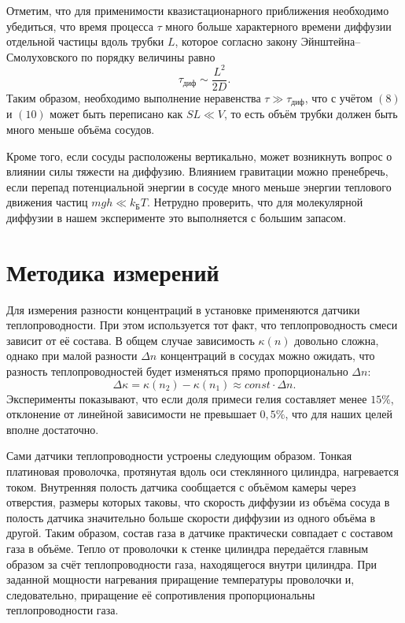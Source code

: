 \documentclass[a4paper,12pt]{article}
\begin{document}
Отметим, что для применимости квазистационарного приближения необходимо убедиться, что время процесса $\tau$ много больше характерного времени диффузии отдельной частицы вдоль трубки $L$, которое согласно закону Эйнштейна–Смолуховского по порядку величины равно
\begin{equation}
	\tau_{\text{диф}} \sim \dfrac{L^2}{2D}.
\end{equation}
Таким образом, необходимо выполнение неравенства $\tau \gg \tau_{\text{диф}}$, что с учётом $(8)$ и $(10)$ может быть переписано как $SL \ll V$, то есть объём трубки должен быть много меньше объёма сосудов.

Кроме того, если сосуды расположены вертикально, может возникнуть вопрос о влиянии силы тяжести на диффузию. Влиянием гравитации можно пренебречь, если перепад потенциальной энергии в сосуде много меньше энергии теплового движения частиц $mgh \ll k_{\text{Б}} T$. Нетрудно проверить, что для молекулярной диффузии в нашем эксперименте это выполняется с большим запасом.

\section{Методика измерений}

 Для измерения разности концентраций в установке применяются датчики теплопроводности. При этом используется тот факт, что теплопроводность смеси зависит от её состава. В общем случае зависимость $\kappa(n)$ довольно сложна, однако при малой разности $\Delta n$ концентраций в сосудах можно ожидать, что разность теплопроводностей будет изменяться прямо пропорционально $\Delta n$: $$\Delta \kappa = \kappa (n_2) - \kappa (n_1) \approx const \cdot \Delta n.$$
Эксперименты показывают, что если доля примеси гелия составляет менее $15\%$, отклонение от линейной зависимости не превышает $0,5\%$, что для наших целей вполне достаточно.

Сами датчики теплопроводности устроены следующим образом. Тонкая платиновая проволочка, протянутая вдоль оси стеклянного цилиндра, нагревается током. Внутренняя полость датчика сообщается с объёмом камеры через отверстия, размеры которых таковы, что скорость диффузии из объёма сосуда в полость датчика значительно больше скорости диффузии из одного объёма в другой. Таким образом, состав газа в датчике практически совпадает с составом газа в объёме. Тепло от проволочки к стенке цилиндра передаётся главным образом за счёт теплопроводности газа, находящегося внутри цилиндра. При заданной мощности нагревания приращение температуры проволочки и, следовательно, приращение её сопротивления пропорциональны теплопроводности газа.
\end{document}
